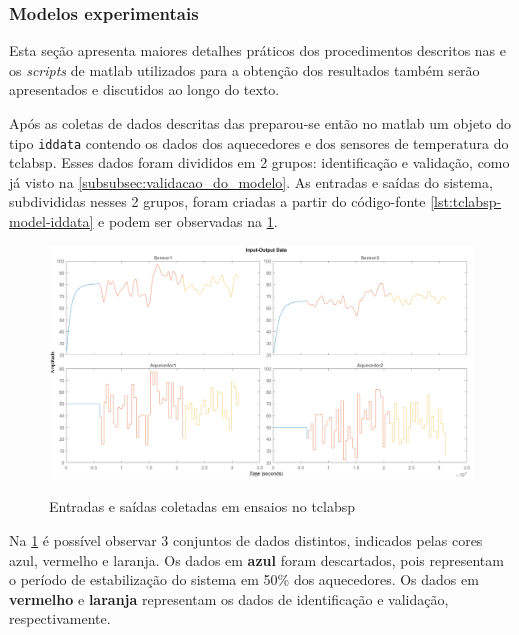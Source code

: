 \subsubsection{Modelos experimentais}
\label{subsubsec:modelo_experimental}

Esta seção apresenta maiores detalhes práticos dos procedimentos descritos nas 
 e os
\textit{scripts} de \acrshort{matlab} utilizados para a obtenção dos resultados também serão
apresentados e discutidos ao longo do texto.

Após as coletas de dados descritas das
preparou-se então no \acrshort{matlab} um objeto do tipo \texttt{iddata} contendo os dados dos aquecedores
e dos sensores de temperatura do \acrshort{tclabsp}.
Esses dados foram divididos em 2 grupos: identificação e validação, como já visto na \cref{subsubsec:validacao_do_modelo}.
As entradas e saídas do sistema, subdivididas nesses 2 grupos, foram criadas a partir do código-fonte
\ref{lst:tclabsp-model-iddata} e podem ser observadas na \cref{fig:tclabsp-model-IOs}.

\begin{figure}[h]
	\caption{Entradas e saídas coletadas em ensaios no \acrshort{tclabsp}}
	\begin{center}
		\includegraphics[width=1.00\textwidth]{./5_images/tclabsp-model-IOs.png} 
		\label{fig:tclabsp-model-IOs}
	\end{center}
	\centering
\end{figure}

Na \cref{fig:tclabsp-model-IOs} é possível observar 3 conjuntos de dados distintos, indicados pelas cores 
azul, vermelho e laranja. Os dados em \textbf{azul} foram descartados, pois representam o período de 
estabilização do sistema em 50\% dos aquecedores. Os dados em \textbf{vermelho} e \textbf{laranja} representam
os dados de identificação e validação, respectivamente.

